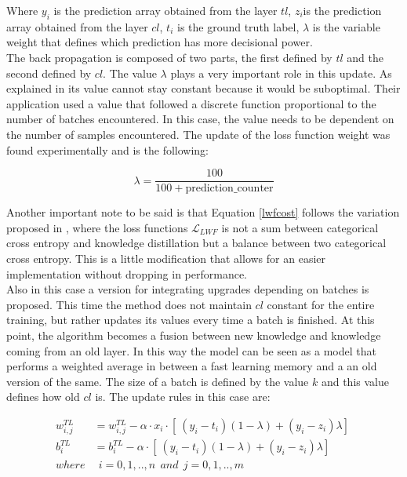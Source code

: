 \documentclass[12pt]{report}
\begin{document}
Where $y_i$ is the prediction array obtained from the layer $tl$, $z_i$is the prediction array obtained from the layer $cl$, $t_i$ is the ground truth label, $\lambda$ is the variable weight that defines which prediction has more decisional power. \\
The back propagation is composed of two parts, the first defined by $tl$ and the second defined by $cl$. The value $\lambda$ plays a very important role in this update. As explained in \autocite{maltoni2019continuous} its value cannot stay constant because it would be suboptimal. Their application used a value that followed a discrete function proportional to the number of batches encountered. In this case, the value needs to be dependent on the number of samples encountered. The update of the loss function weight was found experimentally and is the following:

\begin{equation}
	\lambda = \frac{100}{100+ \text{prediction$\_$counter}}
\end{equation}

Another important note to be said is that Equation \ref{lwfcost} follows the variation proposed in \autocite{maltoni2019continuous}, where the loss functions $\mathcal{L}_{LWF}$ is not a sum between categorical cross entropy and knowledge distillation but a balance between two categorical cross entropy. This is a little modification that allows for an easier implementation without dropping in performance. \\
Also in this case a version for integrating upgrades depending on batches is proposed. This time the method does not maintain $cl$ constant for the entire training, but rather updates its values every time a batch is finished. At this point, the algorithm becomes a fusion between new knowledge and knowledge coming from an old layer. In this way the model can be seen as a model that performs a weighted average in between a fast learning memory and a an old version of the same. The size of a batch is defined by the value $k$ and this value defines how old $cl$ is. The update rules in this case are:

\begin{align}
	w^{TL}_{i,j} &= w^{TL}_{i,j} - \alpha \cdot x_i \cdot [\ (y_i - t_i)(1-\lambda) + (y_i - z_i)\lambda ]\ \\
	b^{TL}_i     &= b^{TL}_i - \alpha \cdot [\ (y_i - t_i)(1-\lambda) + (y_i - z_i)\lambda ]\ \\
	where        & \: \: i= 0,1,..,n  \: \: and \: \:  j=0,1,..,m \nonumber  
\end{align} 
\end{document}

